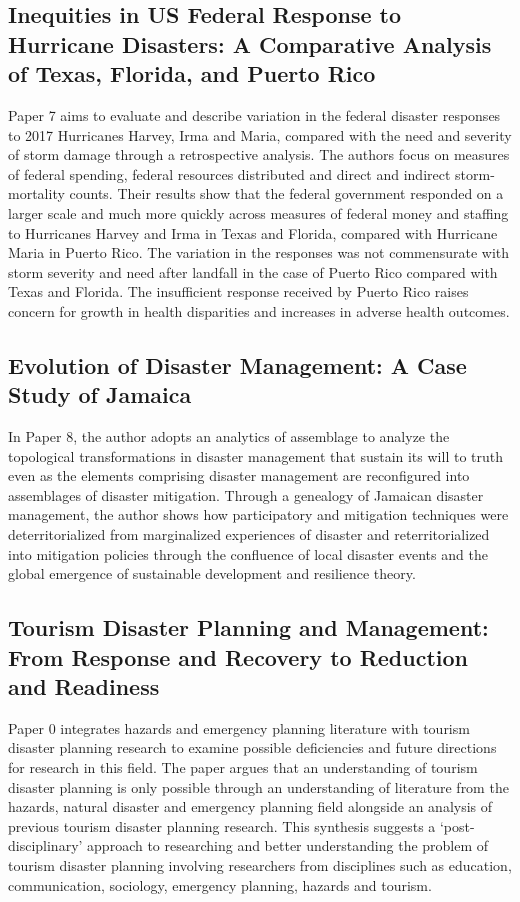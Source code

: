 \documentclass{article}
\begin{document}
\subsection{Inequities in US Federal Response to Hurricane Disasters: A Comparative Analysis of Texas, Florida, and Puerto Rico}
Paper 7 aims to evaluate and describe variation in the federal disaster responses to 2017 Hurricanes Harvey, Irma and Maria, compared with the need and severity of storm damage through a retrospective analysis. The authors focus on measures of federal spending, federal resources distributed and direct and indirect storm-mortality counts. Their results show that the federal government responded on a larger scale and much more quickly across measures of federal money and staffing to Hurricanes Harvey and Irma in Texas and Florida, compared with Hurricane Maria in Puerto Rico. The variation in the responses was not commensurate with storm severity and need after landfall in the case of Puerto Rico compared with Texas and Florida. The insufficient response received by Puerto Rico raises concern for growth in health disparities and increases in adverse health outcomes.

\subsection{Evolution of Disaster Management: A Case Study of Jamaica}
In Paper 8, the author adopts an analytics of assemblage to analyze the topological transformations in disaster management that sustain its will to truth even as the elements comprising disaster management are reconfigured into assemblages of disaster mitigation. Through a genealogy of Jamaican disaster management, the author shows how participatory and mitigation techniques were deterritorialized from marginalized experiences of disaster and reterritorialized into mitigation policies through the confluence of local disaster events and the global emergence of sustainable development and resilience theory.

\subsection{Tourism Disaster Planning and Management: From Response and Recovery to Reduction and Readiness}
Paper 0 integrates hazards and emergency planning literature with tourism disaster planning research to examine possible deficiencies and future directions for research in this field. The paper argues that an understanding of tourism disaster planning is only possible through an understanding of literature from the hazards, natural disaster and emergency planning field alongside an analysis of previous tourism disaster planning research. This synthesis suggests a ‘post-disciplinary’ approach to researching and better understanding the problem of tourism disaster planning involving researchers from disciplines such as education, communication, sociology, emergency planning, hazards and tourism.
\end{document}
